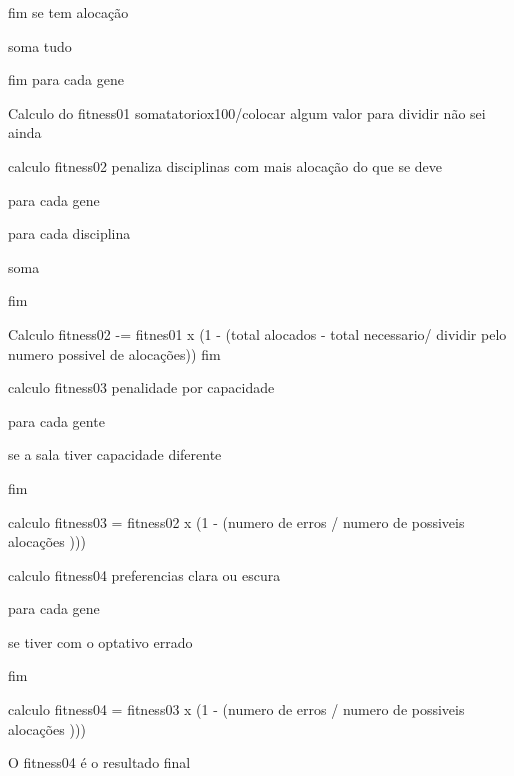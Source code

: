 	fim se tem alocação

	soma tudo

fim para cada gene

Calculo do fitness01 somatatoriox100/colocar algum valor  para dividir não sei ainda

calculo fitness02 penaliza disciplinas com mais alocação do que se deve

para cada gene 

	para cada disciplina 

	soma

	fim

	Calculo fitness02 -= fitnes01 x (1 - (total alocados - total necessario/ dividir pelo numero possivel de alocações))
fim

calculo fitness03 penalidade por capacidade

	para cada gente

		se a sala tiver capacidade diferente
		
	fim

	calculo fitness03 = fitness02 x (1 - (numero de erros /  numero de possiveis alocações )))


calculo fitness04 preferencias clara ou escura

	para cada gene 

		se tiver com o optativo errado 

	fim	

	calculo fitness04 = fitness03 x (1 - (numero de erros /  numero de possiveis alocações )))


O fitness04 é o resultado final